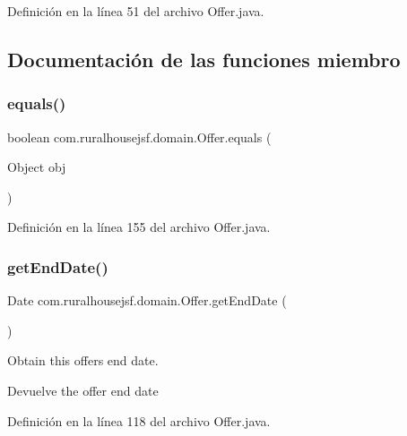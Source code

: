 Definición en la línea 51 del archivo Offer.\+java.



\subsection{Documentación de las funciones miembro}
\mbox{\label{classcom_1_1ruralhousejsf_1_1domain_1_1_offer_aea11cafbf3e7304d38630b80a3f4dc1e}} 
\subsubsection{\texorpdfstring{equals()}{equals()}}
{\footnotesize\ttfamily boolean com.\+ruralhousejsf.\+domain.\+Offer.\+equals (\begin{DoxyParamCaption}\item[{Object}]{obj }\end{DoxyParamCaption})}



Definición en la línea 155 del archivo Offer.\+java.

\mbox{\label{classcom_1_1ruralhousejsf_1_1domain_1_1_offer_aa6adb6e4f0999247d9426233f62b2185}} 
\subsubsection{\texorpdfstring{getEndDate()}{getEndDate()}}
{\footnotesize\ttfamily Date com.\+ruralhousejsf.\+domain.\+Offer.\+get\+End\+Date (\begin{DoxyParamCaption}{ }\end{DoxyParamCaption})}



Obtain this offers end date. 

\begin{DoxyReturn}{Devuelve}
the offer end date 
\end{DoxyReturn}


Definición en la línea 118 del archivo Offer.\+java.

